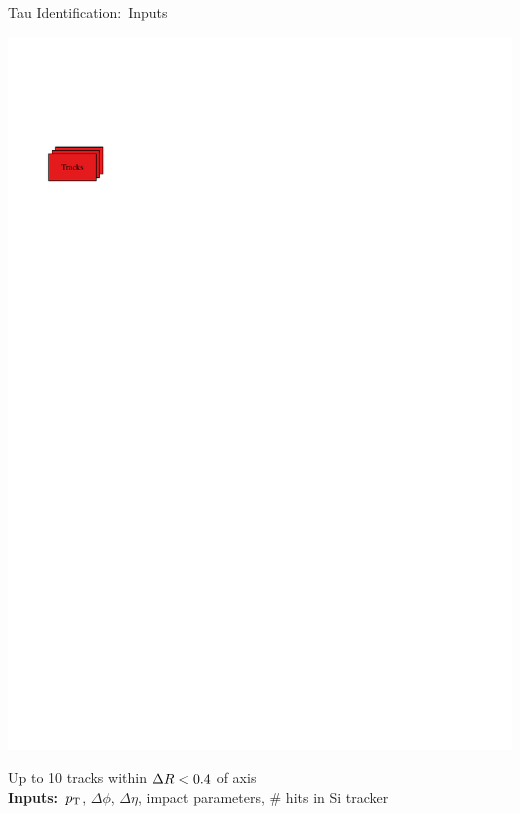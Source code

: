 \documentclass[11pt, xcolor={dvipsnames}, aspectratio=169, notes]{beamer}
\begin{document}
\begin{frame}{Tau Identification:\ Inputs}
\begin{minipage}[c][2.2cm][c]{0.25\textwidth}
    \includegraphics[scale=1]{tauid/track_icon}
  \end{minipage}%
  \begin{minipage}[c][2.2cm][c]{0.75\textwidth}
    Up to 10 tracks within $\Delta R < 0.4$ of \tauhadvis axis\\[0.5\baselineskip]
    \textbf{Inputs:}\ $p_{\text{T}}$, $\Delta \phi$, $\Delta \eta$, impact parameters, \#
    hits in Si tracker
  \end{minipage}%


  \begin{minipage}[c][2.2cm][c]{0.25\textwidth}
    \centering


\end{minipage}
\end{frame}
\end{document}
